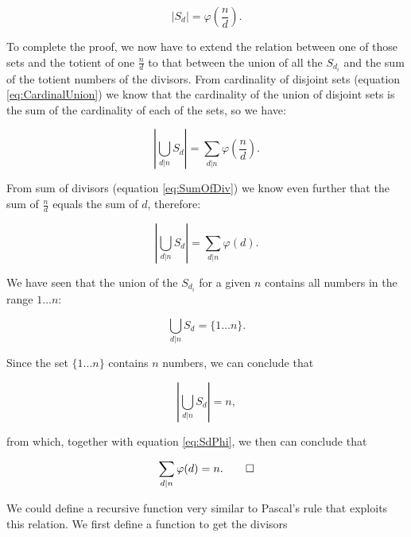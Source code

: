 \documentclass[tikz]{scrreprt}
\begin{document}
\begin{equation}
|S_d| = \varphi\left(\frac{n}{d}\right).
\end{equation}

To complete the proof, we now have
to extend the relation between one of those sets and
the totient of one $\frac{n}{d}$ to that between the union of
all the $S_{d_i}$ and the sum of the totient numbers
of the divisors.
From cardinality of disjoint sets (equation \ref{eq:CardinalUnion})
we know that the cardinality of the union of disjoint sets
is the sum of the cardinality of each of the sets,
so we have:

\begin{equation}
\left|\bigcup_{d|n}{S_d}\right| = \sum_{d|n}{\varphi\left(\frac{n}{d}\right)}.
\end{equation}

From sum of divisors (equation \ref{eq:SumOfDiv})
we know even further that the sum of $\frac{n}{d}$ 
equals the sum of $d$, therefore: %

\begin{equation}\label{eq:SdPhi}
\left|\bigcup_{d|n}{S_d}\right| = \sum_{d|n}{\varphi(d)}.
\end{equation}

We have seen that the union of the $S_{d_i}$ for a given $n$
contains all numbers in the range $1\dots n$:

\begin{equation}
\bigcup_{d|n}{S_d} = \lbrace 1\dots n\rbrace.
\end{equation}

Since the set $\lbrace 1\dots n\rbrace$ contains $n$ 
numbers, we can conclude that

\begin{equation}
\left|\bigcup_{d|n}{S_d}\right| = n,
\end{equation}

from which, together with equation \ref{eq:SdPhi}, 
we then can conclude that

\begin{equation}
\sum_{d|n}{\varphi(d)} = n.\qed
\end{equation}

We could define a recursive function
very similar to Pascal's rule that exploits this relation.
We first define a function to get the divisors
\end{document}
